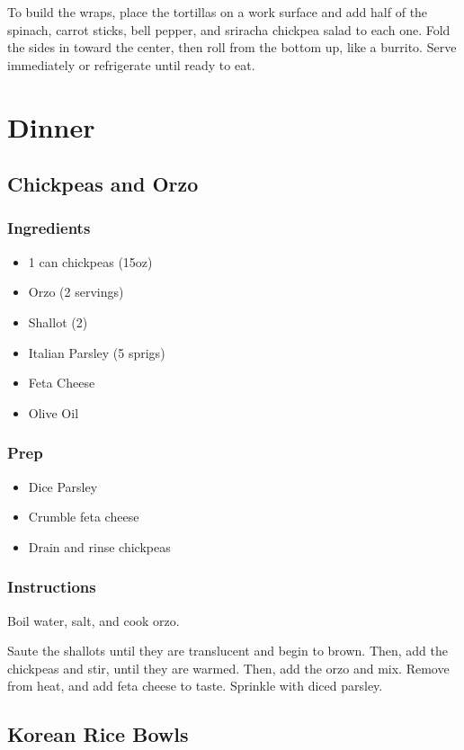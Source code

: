 \documentclass[11pt]{article}
\begin{document}
To build the wraps, place the tortillas on a work surface and add
half of the spinach, carrot sticks, bell pepper, and sriracha
chickpea salad to each one. Fold the sides in toward the center,
then roll from the bottom up, like a burrito. Serve immediately or
refrigerate until ready to eat.
\section{Dinner}
\label{sec:org8d31b38}
\subsection{Chickpeas and Orzo}
\label{sec:orgd8e01ae}
\subsubsection{Ingredients}
\label{sec:orgf590341}
\begin{itemize}
\item 1 can chickpeas (15oz)
\item Orzo (2 servings)
\item Shallot (2)
\item Italian Parsley (5 sprigs)
\item Feta Cheese
\item Olive Oil
\end{itemize}
\subsubsection{Prep}
\label{sec:org89fb210}
\begin{itemize}
\item Dice Parsley
\item Crumble feta cheese
\item Drain and rinse chickpeas
\end{itemize}
\subsubsection{Instructions}
\label{sec:orgf1b5a5b}
Boil water, salt, and cook orzo.

Saute the shallots until they are translucent and begin
to brown. Then, add the chickpeas and stir, until they are warmed.
Then, add the orzo and mix. Remove from heat, and add feta cheese
to taste. Sprinkle with diced parsley.
\subsection{Korean Rice Bowls}
\label{sec:org86f9c2a}
\end{document}
